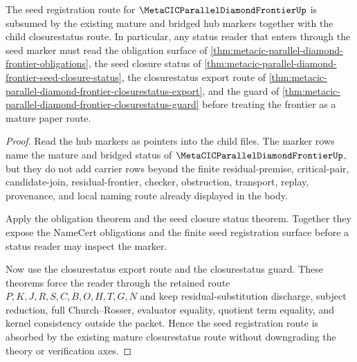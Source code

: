 \begin{theorem}
\label{thm:metacic-parallel-diamond-frontier-seed-closure-status-sync}
The seed registration route for $\MetaCICParallelDiamondFrontierUp$ is subsumed by the existing mature and bridged hub markers together with the child closurestatus route. In particular, any status reader that enters through the seed marker must read the obligation surface of \autoref{thm:metacic-parallel-diamond-frontier-obligations}, the seed closure status of \autoref{thm:metacic-parallel-diamond-frontier-seed-closure-status}, the closurestatus export route of \autoref{thm:metacic-parallel-diamond-frontier-closurestatus-export}, and the guard of \autoref{thm:metacic-parallel-diamond-frontier-closurestatus-guard} before treating the frontier as a mature paper route.
\end{theorem}
\begin{proof}
Read the hub markers as pointers into the child files. The marker rows name the mature and bridged status of $\MetaCICParallelDiamondFrontierUp$, but they do not add carrier rows beyond the finite residual-premise, critical-pair, candidate-join, residual-frontier, checker, obstruction, transport, replay, provenance, and local naming route already displayed in the body.

Apply the obligation theorem and the seed closure status theorem. Together they expose the NameCert obligations and the finite seed registration surface before a status reader may inspect the marker.

Now use the closurestatus export route and the closurestatus guard. These theorems force the reader through the retained route $P,K,J,R,S,C,B,O,H,T,G,N$ and keep residual-substitution discharge, subject reduction, full Church--Rosser, evaluator equality, quotient term equality, and kernel consistency outside the packet. Hence the seed registration route is absorbed by the existing mature closurestatus route without downgrading the theory or verification axes.
\end{proof}

